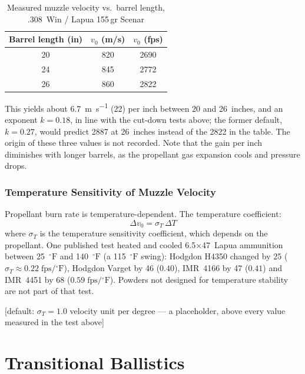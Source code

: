 \documentclass[11pt,twoside,openright]{report}
\newcommand{\degF}{\ensuremath{{}^{\circ}\mathrm{F}}}
\newcommand{\default}[1]{\;\textrm{\textcolor{blue!60!black}{[default: #1]}}}
\begin{document}
\begin{table}[H]
\centering
\caption{Measured muzzle velocity vs.\ barrel length, .308~Win / Lapua 155\,gr Scenar}
\label{tab:barrel_length_308}
\small
\begin{tabular}{@{}ccc@{}}
\toprule
\textbf{Barrel length (in)} & \textbf{$v_0$ (m/s)} & \textbf{$v_0$ (fps)} \\
\midrule
20 & 820 & 2690 \\
24 & 845 & 2772 \\
26 & 860 & 2822 \\
\bottomrule
\end{tabular}
\end{table}

This yields about \SI{6.7}{\meter\per\second} (\SI{22}{\fps}) per inch between 20 and 26~inches, and an exponent $k = 0.18$, in line with the cut-down tests above; the former default, $k = 0.27$, would predict \SI{2887}{\fps} at 26~inches instead of the \SI{2822}{\fps} in the table. The origin of these three values is not recorded. Note that the gain per inch diminishes with longer barrels, as the propellant gas expansion cools and pressure drops.

\subsection{Temperature Sensitivity of Muzzle Velocity}

Propellant burn rate is temperature-dependent. The temperature coefficient:
\begin{equation}
  \Delta v_0 = \sigma_T\,\Delta T
  \label{eq:temp_sensitivity}
\end{equation}
where $\sigma_T$ is the temperature sensitivity coefficient, which depends on the propellant. One published test \citep{zant2016powder} heated and cooled 6.5$\times$47~Lapua ammunition between \SI{25}{\degF} and \SI{140}{\degF} (a \SI{115}{\degF} swing): Hodgdon H4350 changed by \SI{25}{\fps} ($\sigma_T \approx 0.22\;\text{fps}/\degF$), Hodgdon Varget by \SI{46}{\fps} ($0.40$), IMR~4166 by \SI{47}{\fps} ($0.41$) and IMR~4451 by \SI{68}{\fps} ($0.59\;\text{fps}/\degF$). Powders not designed for temperature stability are not part of that test.

\default{$\sigma_T = 1.0$ velocity unit per degree --- a placeholder, above every value measured in the test above}


\chapter{Transitional Ballistics}
\label{ch:transitional}
\end{document}
